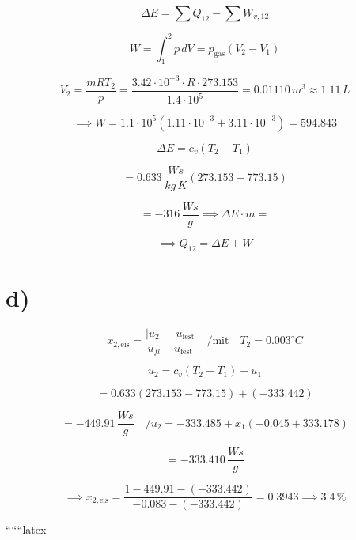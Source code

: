 \[
\Delta E = \sum Q_{12} - \sum W_{v,12}
\]

\[
W = \int_{1}^{2} p \, dV = p_{\text{gas}} (V_2 - V_1)
\]

\[
V_2 = \frac{mRT_2}{p} = \frac{3.42 \cdot 10^{-3} \cdot R \cdot 273.153}{1.4 \cdot 10^5} = 0.01110 \, m^3 \approx 1.11 \, L
\]

\[
\implies W = 1.1 \cdot 10^5 \left(1.11 \cdot 10^{-3} + 3.11 \cdot 10^{-3}\right) = 594.843
\]

\[
\Delta E = c_v (T_2 - T_1)
\]

\[
= 0.633 \, \frac{Ws}{kg \, K} \left(273.153 - 773.15\right)
\]

\[
= -316 \, \frac{Ws}{g} \implies \Delta E \cdot m =
\]

\[
\implies Q_{12} = \Delta E + W
\]

\section*{d)}

\[
x_{2, \text{eis}} = \frac{|u_2| - u_{\text{fest}}}{u_{fl} - u_{\text{fest}}} \quad / \text{mit} \quad T_2 = 0.003^\circ C
\]

\[
u_2 = c_v (T_2 - T_1) + u_1
\]

\[
= 0.633 \left(273.153 - 773.15\right) + (-333.442)
\]

\[
= -449.91 \, \frac{Ws}{g} \quad / u_2 = -333.485 + x_1 (-0.045 + 333.178)
\]

\[
= -333.410 \, \frac{Ws}{g}
\]

\[
\implies x_{2, \text{eis}} = \frac{1 - 449.91 - (-333.442)}{-0.083 - (-333.442)} = 0.3943 \implies 3.4 \, \% 
\]

``````latex


